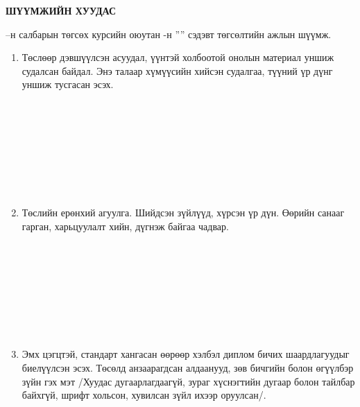 \begin{titlepage}
\begin{center}

{\scshape\Large \univname\par} %
{\scshape\large \facname\par}\vspace{1cm} %

\textbf{{\Large ШҮҮМЖИЙН ХУУДАС}}\\[1cm]

\end{center}

\normalsize

\deptname --н салбарын төгсөх курсийн оюутан \shortname -н ''\ttitle'' сэдэвт төгсөлтийн ажлын шүүмж.

\begin{enumerate}
\item Төслөөр дэвшүүлсэн асуудал, үүнтэй холбоотой онолын материал уншиж судалсан байдал. Энэ талаар хүмүүсийн хийсэн судалгаа, түүний үр дүнг уншиж тусгасан эсэх.
\begin{center}
\dotfill \\[0.1cm]
\dotfill \\[0.1cm]
\dotfill \\[0.1cm]
\dotfill \\[0.1cm]
\dotfill \\[0.1cm]
\dotfill \\[0.1cm]
\dotfill \\[0.4cm]
\end{center}
\item Төслийн ерөнхий агуулга. Шийдсэн зүйлүүд, хүрсэн үр дүн. Өөрийн санааг гарган, харьцуулалт хийн, дүгнэж байгаа чадвар.
\begin{center}
\dotfill \\[0.1cm]
\dotfill \\[0.1cm]
\dotfill \\[0.1cm]
\dotfill \\[0.1cm]
\dotfill \\[0.1cm]
\dotfill \\[0.1cm]
\dotfill \\[0.4cm]
\end{center}
\item Эмх цэгцтэй, стандарт хангасан өөрөөр хэлбэл диплом бичих шаардлагуудыг биелүүлсэн эсэх. Төсөлд анзаарагдсан алдаанууд, зөв бичгийн болон өгүүлбэр зүйн гэх мэт /Хуудас дугаарлагдаагүй, зураг хүснэгтийн дугаар болон тайлбар байхгүй, шрифт хольсон, хувилсан зүйл ихээр оруулсан/.
\begin{center}
\dotfill \\[0.1cm]
\dotfill \\[0.1cm]
\dotfill \\[0.1cm]
\dotfill \\[0.1cm]
\dotfill \\[0.1cm]
\end{center}
\end{enumerate}
\end{titlepage}

